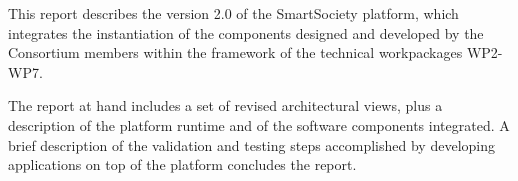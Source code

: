 This report describes the version 2.0 of the SmartSociety platform, which integrates the instantiation of the components designed and developed by the Consortium members within the framework of the technical workpackages WP2-WP7. 

The report at hand includes a set of revised architectural views, plus a description of the platform runtime and of the software components integrated. A brief description of the validation and testing steps accomplished by developing applications on top of the platform concludes the report. 



